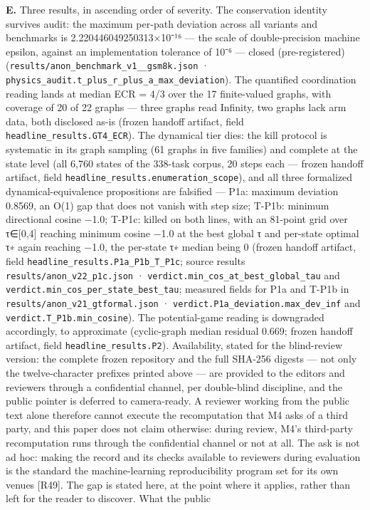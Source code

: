 \documentclass[11pt,a4paper]{article}
\begin{document}
\textbf{E.} Three results, in ascending order of severity. The conservation identity survives audit: the maximum per-path deviation across all variants and benchmarks is 2.220446049250313×10⁻¹⁶ — the scale of double-precision machine epsilon, against an implementation tolerance of 10⁻⁶ — closed (pre-registered) (\texttt{results/\allowbreak anon\_\allowbreak benchmark\_\allowbreak v1\_\_\allowbreak gsm8k.json} · \texttt{physics\_\allowbreak audit.t\_\allowbreak plus\_\allowbreak r\_\allowbreak plus\_\allowbreak a\_\allowbreak max\_\allowbreak deviation}). The quantified coordination reading lands at median ECR = 4/3 over the 17 finite-valued graphs, with coverage of 20 of 22 graphs — three graphs read Infinity, two graphs lack arm data, both disclosed as-is (frozen handoff artifact, field \texttt{headline\_\allowbreak results.GT4\_\allowbreak ECR}). The dynamical tier dies: the kill protocol is systematic in its graph sampling (61 graphs in five families) and complete at the state level (all 6,760 states of the 338-task corpus, 20 steps each — frozen handoff artifact, field \texttt{headline\_\allowbreak results.enumeration\_\allowbreak scope}), and all three formalized dynamical-equivalence propositions are falsified — P1a: maximum deviation 0.8569, an O(1) gap that does not vanish with step size; T-P1b: minimum directional cosine −1.0; T-P1c: killed on both lines, with an 81-point grid over τ∈[0,4] reaching minimum cosine −1.0 at the best global τ and per-state optimal τ∗ again reaching −1.0, the per-state τ∗ median being 0 (frozen handoff artifact, field \texttt{headline\_\allowbreak results.P1a\_\allowbreak P1b\_\allowbreak T\_\allowbreak P1c}; source results \texttt{results/\allowbreak anon\_\allowbreak v22\_\allowbreak p1c.json} · \texttt{verdict.min\_\allowbreak cos\_\allowbreak at\_\allowbreak best\_\allowbreak global\_\allowbreak tau} and \texttt{verdict.min\_\allowbreak cos\_\allowbreak per\_\allowbreak state\_\allowbreak best\_\allowbreak tau}; measured fields for P1a and T-P1b in \texttt{results/\allowbreak anon\_\allowbreak v21\_\allowbreak gtformal.json} · \texttt{verdict.P1a\_\allowbreak deviation.max\_\allowbreak dev\_\allowbreak inf} and \texttt{verdict.T\_\allowbreak P1b.min\_\allowbreak cosine}). The potential-game reading is downgraded accordingly, to approximate (cyclic-graph median residual 0.669; frozen handoff artifact, field \texttt{headline\_\allowbreak results.P2}). Availability, stated for the blind-review version: the complete frozen repository and the full SHA-256 digests — not only the twelve-character prefixes printed above — are provided to the editors and reviewers through a confidential channel, per double-blind discipline, and the public pointer is deferred to camera-ready. A reviewer working from the public text alone therefore cannot execute the recomputation that M4 asks of a third party, and this paper does not claim otherwise: during review, M4's third-party recomputation runs through the confidential channel or not at all. The ask is not ad hoc: making the record and its checks available to reviewers during evaluation is the standard the machine-learning reproducibility program set for its own venues [R49]. The gap is stated here, at the point where it applies, rather than left for the reader to discover. What the public 
\end{document}
